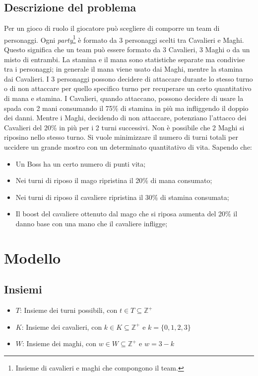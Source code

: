 \documentclass[12pt]{article}
\begin{document}
    \subsection{Descrizione del problema}
    Per un gioco di ruolo il giocatore può scegliere di comporre un team di personaggi.
    Ogni \textit{party}\footnote{Insieme di cavalieri e maghi che compongono il team.} è formato da 3 personaggi scelti tra Cavalieri e Maghi. Questo significa che un team può essere formato da 3 Cavalieri, 3 Maghi o da un misto di entrambi. 
    La stamina e il mana sono statistiche separate ma condivise tra i personaggi; in generale
    il mana viene usato dai Maghi, mentre la stamina dai Cavalieri.
    I 3 personaggi possono decidere di attaccare durante lo stesso turno o di non attaccare per quello specifico turno per recuperare un certo quantitativo di mana e stamina.
    I Cavalieri, quando attaccano, possono decidere di usare la spada con 2 mani consumando il 75\% di stamina in più ma infliggendo il doppio dei danni. Mentre i Maghi, decidendo di non attaccare, potenziano l'attacco dei Cavalieri del 20\% in più per i 2 turni successivi. Non è possibile che 2 Maghi si riposino nello stesso turno. Si vuole minimizzare il numero di turni totali per uccidere un grande mostro con un determinato quantitativo di vita. Sapendo che:
    \begin{itemize}
        \item Un Boss ha un certo numero di punti vita;
        \item Nei turni di riposo il mago ripristina il 20$\%$ di mana consumato;
        \item Nei turni di riposo il cavaliere ripristina il 30$\%$ di stamina consumata;
        \item Il boost del cavaliere ottenuto dal mago che si riposa aumenta del 20$\%$ il danno base con una mano che il cavaliere infligge;
    \end{itemize}

    \section{Modello}
    \subsection{Insiemi}
    \begin{itemize}
        \item $T$: Insieme dei turni possibili, con $t \in T \subseteq \mathbb{Z}^+$
        \item $K$: Insieme dei cavalieri, con $k \in K \subseteq \mathbb{Z}^+$ e $k = \{ 0,1,2,3 \}$
        \item $W$: Insieme dei maghi, con $w \in W \subseteq \mathbb{Z}^+$ e $w = 3- k$
    \end{itemize}
\end{document}
